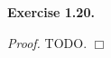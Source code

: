 \documentclass{article}
\begin{document}



\textbf{Exercise 1.20.}

\emph{Proof.}
TODO.
$\Box$ \\\\



\end{document}
